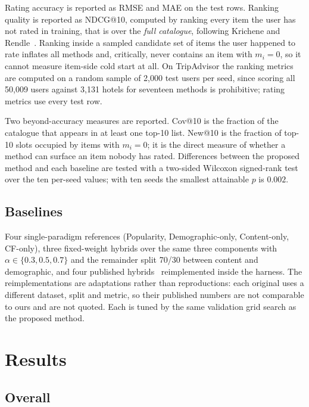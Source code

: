 \documentclass[runningheads]{llncs}
\begin{document}
Rating accuracy is reported as RMSE and MAE on the test rows. Ranking quality is reported as NDCG@10, computed by ranking every item the user has not rated in training, that is over the \emph{full catalogue}, following Krichene and Rendle~\cite{krichene2020}. Ranking inside a sampled candidate set of items the user happened to rate inflates all methods and, critically, never contains an item with $m_i = 0$, so it cannot measure item-side cold start at all. On TripAdvisor the ranking metrics are computed on a random sample of 2{,}000 test users per seed, since scoring all 50{,}009 users against 3{,}131 hotels for seventeen methods is prohibitive; rating metrics use every test row.

Two beyond-accuracy measures are reported. Cov@10 is the fraction of the catalogue that appears in at least one top-10 list. New@10 is the fraction of top-10 slots occupied by items with $m_i = 0$; it is the direct measure of whether a method can surface an item nobody has rated. Differences between the proposed method and each baseline are tested with a two-sided Wilcoxon signed-rank test over the ten per-seed values; with ten seeds the smallest attainable $p$ is $0.002$.

\subsection{Baselines}

Four single-paradigm references (Popularity, Demographic-only, Content-only, CF-only), three fixed-weight hybrids over the same three components with $\alpha \in \{0.3, 0.5, 0.7\}$ and the remainder split 70/30 between content and demographic, and four published hybrids~\cite{tarek2022,do2020,ohwsf2025,slarec2026} reimplemented inside the harness. The reimplementations are adaptations rather than reproductions: each original uses a different dataset, split and metric, so their published numbers are not comparable to ours and are not quoted. Each is tuned by the same validation grid search as the proposed method.

\section{Results}
\label{sec:results}

\subsection{Overall}
\end{document}
